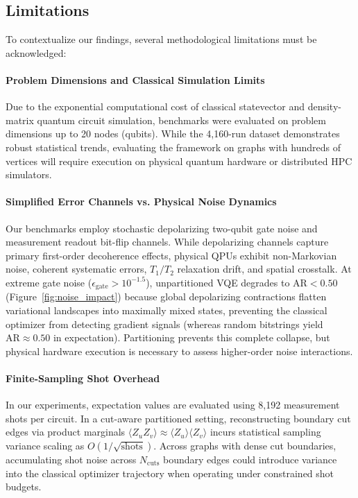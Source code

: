 \documentclass[pdflatex,sn-mathphys-num]{sn-jnl}
\theoremstyle{thmstyleone}
\theoremstyle{thmstyletwo}%
\theoremstyle{thmstylethree}%
\begin{document}
\subsection{Limitations}
\label{subsec:limitations}

To contextualize our findings, several methodological limitations must be acknowledged:

\paragraph{Problem Dimensions and Classical Simulation Limits} Due to the exponential computational cost of classical statevector and density-matrix quantum circuit simulation, benchmarks were evaluated on problem dimensions up to 20 nodes (qubits). While the 4,160-run dataset demonstrates robust statistical trends, evaluating the framework on graphs with hundreds of vertices will require execution on physical quantum hardware or distributed HPC simulators.

\paragraph{Simplified Error Channels vs. Physical Noise Dynamics} Our benchmarks employ stochastic depolarizing two-qubit gate noise and measurement readout bit-flip channels. While depolarizing channels capture primary first-order decoherence effects, physical QPUs exhibit non-Markovian noise, coherent systematic errors, $T_1/T_2$ relaxation drift, and spatial crosstalk. At extreme gate noise ($\epsilon_{\text{gate}} > 10^{-1.5}$), unpartitioned VQE degrades to $\text{AR} < 0.50$ (Figure~\ref{fig:noise_impact}) because global depolarizing contractions flatten variational landscapes into maximally mixed states, preventing the classical optimizer from detecting gradient signals (whereas random bitstrings yield $\text{AR} \approx 0.50$ in expectation). Partitioning prevents this complete collapse, but physical hardware execution is necessary to assess higher-order noise interactions.

\paragraph{Finite-Sampling Shot Overhead} In our experiments, expectation values are evaluated using 8,192 measurement shots per circuit. In a cut-aware partitioned setting, reconstructing boundary cut edges via product marginals $\langle Z_u Z_v \rangle \approx \langle Z_u \rangle \langle Z_v \rangle$ incurs statistical sampling variance scaling as $O(1/\sqrt{\text{shots}})$. Across graphs with dense cut boundaries, accumulating shot noise across $N_{\text{cuts}}$ boundary edges could introduce variance into the classical optimizer trajectory when operating under constrained shot budgets.
\end{document}
